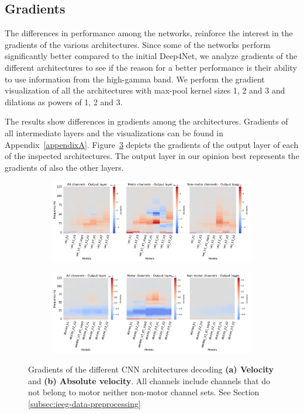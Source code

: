 \subsection{Gradients}\label{subsec:gradients}
The differences in performance among the networks, reinforce the interest in the gradients of the various architectures.
Since some of the networks perform significantly better compared to the initial Deep4Net, we analyze gradients of the different architectures to see if the reason for a better performance is their ability to use information from the high-gamma band.
We perform the gradient visualization of all the architectures with max-pool kernel sizes 1, 2 and 3 and dilations as powers of 1, 2 and 3.

The results show differences in gradients among the architectures.
Gradients of all intermediate layers and the visualizations can be found in Appendix~\ref{appendixA}.
Figure~\ref{fig:last-layer-grads} depicts the gradients of the output layer of each of the inspected architectures. The output layer in our opinion best represents the gradients of also the other layers.

\begin{figure}[!htpb]
\centering
\begin{subfigure}[b]{\textwidth}
   \includegraphics[width=1\linewidth]{img/ch4/vel-last-layer-grads}
   \caption{}
   \label{fig:absVel-last-layer-grads}
\end{subfigure}

\begin{subfigure}[b]{\textwidth}
   \includegraphics[width=1\linewidth]{img/ch4/absVel-last-layer-grads}
   \caption{}
   \label{fig:vel-last-layer-grads}
\end{subfigure}
\caption[Non-shifted causal prediction - gradients]{Gradients of the different CNN architectures decoding \textbf{(a) Velocity} and \textbf{(b) Absolute velocity}. All channels include channels that do not belong to motor neither non-motor channel sets. See Section \ref{subsec:ieeg-data-preprocessing}}
\label{fig:last-layer-grads}
\end{figure}

